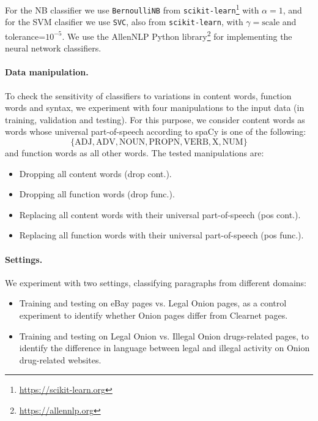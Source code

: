 \documentclass[11pt,a4paper,table]{article}
\begin{document}
For the NB classifier we use \texttt{BernoulliNB} from
\texttt{scikit-learn}\footnote{\url{https://scikit-learn.org}}
with $\alpha=1$,
and for the SVM clasifier we use \texttt{SVC}, also from \texttt{scikit-learn},
with $\gamma=\mathrm{scale}$ and tolerance=$10^{-5}$.
We use the AllenNLP Python library\footnote{\url{https://allennlp.org}}
\cite{Gardner2017AllenNLP} for implementing the neural network classifiers.

\paragraph{Data manipulation.}

To check the sensitivity of classifiers to variations in content words,
function words and syntax, we experiment with four manipulations to the input
data (in training, validation and testing).
For this purpose, we consider content words as words whose universal part-of-speech
according to spaCy is one of the following:
\[\{\mathrm{ADJ, ADV, NOUN, PROPN, VERB, X, NUM}\}\]
and function words as all other words.
The tested manipulations are:

\begin{itemize}
  \item Dropping all content words (drop cont.).
  \item Dropping all function words (drop func.).
  \item Replacing all content words with their universal part-of-speech (pos cont.).
  \item Replacing all function words with their universal part-of-speech (pos func.).
\end{itemize}

\paragraph{Settings.}

We experiment with two settings, classifying paragraphs from different domains:
\begin{itemize}
  \item Training and testing on eBay pages vs. Legal Onion pages,
  as a control experiment
  to identify whether Onion pages differ from Clearnet pages.
  \item Training and testing on Legal Onion vs. Illegal Onion drugs-related pages,
  to identify the difference in language between legal and illegal activity
  on Onion drug-related websites.
  
\end{itemize}
\end{document}
